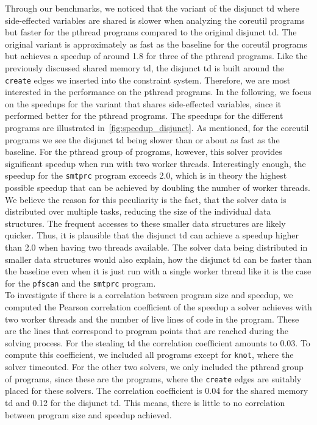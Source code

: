   Through our benchmarks, we noticed that the variant of the disjunct \ac{td} where side-effected variables are shared is slower when analyzing the coreutil programs but faster for the pthread programs compared to the original disjunct \ac{td}. The original variant is approximately as fast as the baseline for the coreutil programs but achieves a speedup of around 1.8 for three of the pthread programs.
  Like the previously discussed shared memory \ac{td}, the disjunct \ac{td} is built around the \texttt{create} edges we inserted into the constraint system. Therefore, we are most interested in the performance on the pthread programs. In the following, we focus on the speedups for the variant that shares side-effected variables, since it performed better for the pthread programs. The speedups for the different programs are illustrated in~\autoref{fig:speedup_disjunct}. As mentioned, for the coreutil programs we see the disjunct \ac{td} being slower than or about as fast as the baseline. For the pthread group of programs, however, this solver provides significant speedup when run with two worker threads. Interestingly enough, the speedup for the \texttt{smtprc} program exceeds 2.0, which is in theory the highest possible speedup that can be achieved by doubling the number of worker threads. We believe the reason for this peculiarity is the fact, that the solver data is distributed over multiple tasks, reducing the size of the individual data structures. The frequent accesses to these smaller data structures are likely quicker. Thus, it is plausible that the disjunct \ac{td} can achieve a speedup higher than 2.0 when having two threads available. The solver data being distributed in smaller data structures would also explain, how the disjunct \ac{td} can be faster than the baseline even when it is just run with a single worker thread like it is the case for the \texttt{pfscan} and the \texttt{smtprc} program.\\
  To investigate if there is a correlation between program size and speedup, we computed the Pearson correlation coefficient of the speedup a solver achieves with two worker threads and the number of live lines of code in the program. These are the lines that correspond to program points that are reached during the solving process. For the stealing \ac{td} the correlation coefficient amounts to 0.03. To compute this coefficient, we included all programs except for \texttt{knot}, where the solver timeouted. For the other two solvers, we only included the pthread group of programs, since these are the programs, where the \texttt{create} edges are suitably placed for these solvers. The correlation coefficient is 0.04 for the shared memory \ac{td} and 0.12 for the disjunct \ac{td}. This means, there is little to no correlation between program size and speedup achieved.
